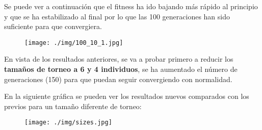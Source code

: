\documentclass[12pt, spanish, pdftex]{UC3M_document}
\begin{document}
Se puede ver a continuación que el fitness ha ido bajando más rápido al principio y que se ha estabilizado al final por lo que las 100 generaciones han sido suficiente para que convergiera. 
\begin{figure}[H]
	{\texttt{[image: ./img/100\_10\_1.jpg]}}
\end{figure}
\pagebreak
En vista de los resultados anteriores, se va a probar primero a reducir los \textbf{tamaños de torneo a 6 y 4 individuos}, se ha aumentado el número de generaciones (150) para que puedan seguir convergiendo con normalidad. 

En la siguiente gráfica se pueden ver los resultados nuevos comparados con los previos para un tamaño diferente de torneo:
\begin{figure}[H]
	{\texttt{[image: ./img/sizes.jpg]}}
\end{figure}
\end{document}
